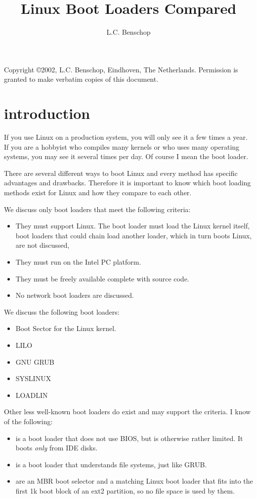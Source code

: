 \documentclass[12pt,a4paper]{article}
\title{Linux Boot Loaders Compared}
\author{L.C. Benschop}
\begin{document}
\maketitle

Copyright \copyright{}2002, L.C. Benschop, Eindhoven, The
Netherlands. Permission is granted to make verbatim copies of this
document.

\tableofcontents

\section{introduction}

If you use Linux on a production system, you will only see it a few
times a year. If you are a hobbyist who compiles many
kernels or who uses many operating systems, you may see it several
times per day. Of course I mean the boot loader.

There are several different ways to boot Linux and every method has
specific advantages and drawbacks. Therefore it is important to know
which boot loading methods exist for Linux and how they compare to
each other.

We discuss only boot loaders that meet the following criteria:
\begin{itemize}
\item They must support Linux. The boot loader must load the Linux
  kernel itself, boot loaders that could chain load another loader,
  which in turn boots Linux, are not discussed,
\item They must run on the Intel PC platform.
\item They must be freely available complete with source code.
\item No network boot loaders are discussed.
\end{itemize}

We discuss the following boot loaders:
\begin{itemize}
\item Boot Sector for the Linux kernel.
\item LILO
\item GNU GRUB
\item SYSLINUX
\item LOADLIN
\end{itemize}
Other less well-known boot loaders do exist and may support the
criteria. I know of the following:
\begin{itemize}
\item
  is a boot loader that does not use BIOS, but is otherwise rather
  limited. It boots {\em only} from IDE disks.
\item {} is a
  boot loader that understands file systems, just like GRUB. 
\item {} are an MBR boot
    selector and a matching Linux boot loader that fits into the first
    1k boot block of an ext2 partition, so no file space is used by them.
\end{itemize}
\end{document}
